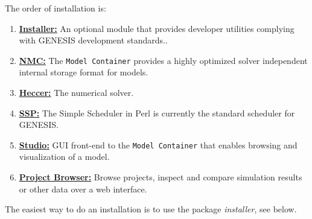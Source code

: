\documentclass[12pt]{article}
\begin{document}
The order of installation is:
\begin{enumerate}
\item \href{../installer-package/installer-package.tex}{\bf Installer:} An optional module that provides developer utilities complying with GENESIS development standards..
\item \href{../model-container/model-container.tex}{\bf NMC:} The {\tt Model Container} provides a highly optimized solver independent internal storage format for models.
\item \href{../heccer/heccer.tex}{\bf Heccer:} The numerical solver.
\item \href{../ssp/ssp.tex}{\bf SSP:} The Simple Scheduler in Perl is currently the standard scheduler for GENESIS.
\item \href{../studio/studio.tex}{\bf Studio:} GUI front-end to the {\tt Model Container} that enables browsing and visualization of a model.
\item \href{../project-browser/project-browser}{\bf Project Browser:} Browse projects, inspect and compare simulation results or other data over a web interface. 
\end{enumerate} 

The easiest way to do an installation is to use the package {\it installer}, see below.




\end{document}
